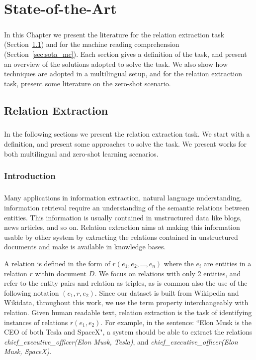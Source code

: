 \chapter{State-of-the-Art} %
\label{chpt:3}
\paragraph{}
In this Chapter we present the literature for the relation extraction task (Section~\ref{sec:sota_re}) and for the machine reading comprehension (Section~\ref{sec:sota_mc}). Each section gives a definition of the task, and present an overview of the solutions adopted to solve the task. We also show how techniques are adopted in a multilingual setup, and for the relation extraction task, present some literature on the zero-shot scenario.   


\section{Relation Extraction}
\label{sec:sota_re}
\paragraph{}
In the following sections we present the relation extraction task. We start with a definition, and present some approaches to solve the task. We present works for both multilingual and zero-shot learning scenarios.

\subsection{Introduction}
\paragraph{}
Many applications in information extraction, natural language understanding, information retrieval require an understanding of the semantic relations between entities. This information is usually contained in unstructured data like blogs, news articles, and so on.  Relation extraction aims at making this information usable by other system by extracting the relations contained in unstructured documents and make is available in knowledge bases.

A relation is defined in the form of $r(e_1, e_2, ..., e_n)$ where the $e_i$ are entities in a relation $r$ within document $D$. We focus on relations with only 2 entities, and refer to the entity pairs and relation as triples, as is common also the use of the following notation $(e_1, r, e_2)$. Since our dataset is built from Wikipedia and Wikidata, throughout this work, we use the term property interchangeably with relation. Given human readable text, relation extraction is the task of identifying instances of relations $r(e_1,e_2)$. For example, in the sentence: ``Elon Musk is the CEO of both Tesla and SpaceX", a system should be able to extract the relations \textit{chief\_executive\_officer({Elon Musk}, Tesla)}, and \textit{chief\_executive\_officer(Elon Musk, SpaceX)}. 

